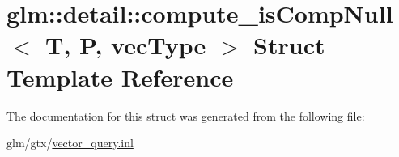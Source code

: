 \hypertarget{structglm_1_1detail_1_1compute__isCompNull}{\section{glm\-:\-:detail\-:\-:compute\-\_\-is\-Comp\-Null$<$ T, P, vec\-Type $>$ Struct Template Reference}
\label{structglm_1_1detail_1_1compute__isCompNull}
}


The documentation for this struct was generated from the following file\-:\begin{DoxyCompactItemize}
\item 
glm/gtx/\hyperlink{vector__query_8inl}{vector\-\_\-query.\-inl}\end{DoxyCompactItemize}
